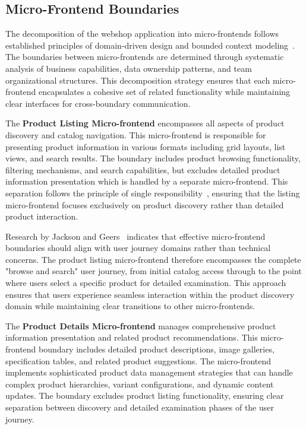\documentclass[12pt,a4paper]{report}
\begin{document}
\subsection{Micro-Frontend Boundaries}

The decomposition of the webshop application into micro-frontends follows established principles of domain-driven design and bounded context modeling~\cite{evans2003domain}. The boundaries between micro-frontends are determined through systematic analysis of business capabilities, data ownership patterns, and team organizational structures. This decomposition strategy ensures that each micro-frontend encapsulates a cohesive set of related functionality while maintaining clear interfaces for cross-boundary communication.

The \textbf{Product Listing Micro-frontend} encompasses all aspects of product discovery and catalog navigation. This micro-frontend is responsible for presenting product information in various formats including grid layouts, list views, and search results. The boundary includes product browsing functionality, filtering mechanisms, and search capabilities, but excludes detailed product information presentation which is handled by a separate micro-frontend. This separation follows the principle of single responsibility~\cite{martin2000principles}, ensuring that the listing micro-frontend focuses exclusively on product discovery rather than detailed product interaction.

Research by Jackson and Geers~\cite{jackson2016microfrontends, geers2019microfrontends} indicates that effective micro-frontend boundaries should align with user journey domains rather than technical concerns. The product listing micro-frontend therefore encompasses the complete "browse and search" user journey, from initial catalog access through to the point where users select a specific product for detailed examination. This approach ensures that users experience seamless interaction within the product discovery domain while maintaining clear transitions to other micro-frontends.

The \textbf{Product Details Micro-frontend} manages comprehensive product information presentation and related product recommendations. This micro-frontend boundary includes detailed product descriptions, image galleries, specification tables, and related product suggestions. The micro-frontend implements sophisticated product data management strategies that can handle complex product hierarchies, variant configurations, and dynamic content updates. The boundary excludes product listing functionality, ensuring clear separation between discovery and detailed examination phases of the user journey.
\end{document}
